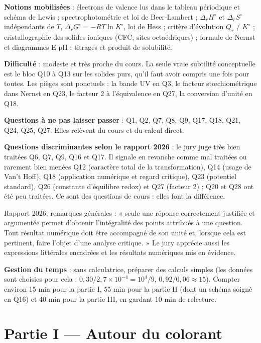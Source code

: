 \documentclass[11pt,a4paper]{article}
\begin{document}
\textbf{Notions mobilisées} : électrons de valence lus dans le tableau périodique et schéma de Lewis ; spectrophotométrie et loi de Beer-Lambert ; \(\Delta_r H^\circ\) et \(\Delta_r S^\circ\) indépendants de \(T\), \(\Delta_r G^\circ = -RT\ln K^\circ\), loi de Hess ; critère d'évolution \(Q_r\) / \(K^\circ\) ; cristallographie des solides ioniques (CFC, sites octaédriques) ; formule de Nernst et diagrammes E-pH ; titrages et produit de solubilité.

\textbf{Difficulté} : modeste et très proche du cours. La seule vraie subtilité conceptuelle est le bloc Q10 à Q13 sur les solides purs, qu'il faut avoir compris une fois pour toutes. Les pièges sont ponctuels : la bande UV en Q3, le facteur stœchiométrique dans Nernst en Q23, le facteur 2 à l'équivalence en Q27, la conversion d'unité en Q18.

\textbf{Questions à ne pas laisser passer} : Q1, Q2, Q7, Q8, Q9, Q17, Q18, Q21, Q24, Q25, Q27. Elles relèvent du cours et du calcul direct.

\textbf{Questions discriminantes selon le rapport 2026} : le jury juge très bien traitées Q6, Q7, Q9, Q16 et Q17. Il signale en revanche comme mal traitées ou rarement bien menées Q12 (caractère total de la transformation), Q14 (usage de Van't Hoff), Q18 (application numérique et regard critique), Q23 (potentiel standard), Q26 (constante d'équilibre redox) et Q27 (facteur 2) ; Q20 et Q28 ont été peu traitées. Ce sont des questions de cours : elles font la différence.

\begin{jury}

Rapport 2026, remarques générales : « seule une réponse correctement justifiée et argumentée permet d'obtenir l'intégralité des points attribués à une question. Tout résultat numérique doit être accompagné de son unité et, lorsque cela est pertinent, faire l'objet d'une analyse critique. » Le jury apprécie aussi les expressions littérales encadrées et les résultats numériques mis en évidence.

\end{jury}

\textbf{Gestion du temps} : sans calculatrice, préparer des calculs simples (les données sont choisies pour cela : \(0{,}30/2{,}7\times10^{-4} = 10^4/9\), \(0{,}92/0{,}06 \approx 15\)). Compter environ 15 min pour la partie I, 55 min pour la partie II (dont un schéma soigné en Q16) et 40 min pour la partie III, en gardant 10 min de relecture.

\hypertarget{partie-i-autour-du-colorant}{%
\section{Partie I --- Autour du colorant}\label{partie-i-autour-du-colorant}}
\end{document}

